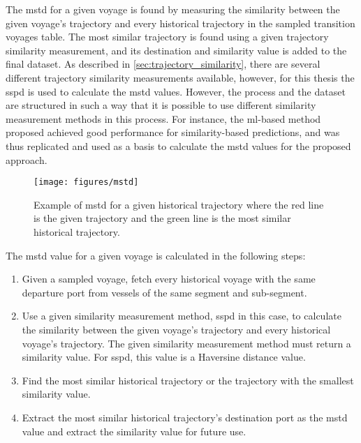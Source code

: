 The \acrshort{mstd} for a given voyage is found by measuring the similarity between the given voyage's trajectory and every historical trajectory in the sampled transition voyages table. The most similar trajectory is found using a given trajectory similarity measurement, and its destination and similarity value is added to the final dataset. As described in \cref{sec:trajectory_similarity}, there are several different trajectory similarity measurements available, however, for this thesis the \acrfull{sspd} is used to calculate the \acrshort{mstd} values. However, the process and the dataset are structured in such a way that it is possible to use different similarity measurement methods in this process. For instance, the \acrshort{ml}-based method proposed \cite{Zhang2020AISApproach} achieved good performance for similarity-based predictions, and was thus replicated and used as a basis to calculate the \acrshort{mstd} values for the proposed approach.

\begin{figure}[htbp]  %
    \centering
    \texttt{[image: figures/mstd]}
    \caption{Example of \acrshort{mstd} for a given historical trajectory where the red line is the given trajectory and the green line is the most similar historical trajectory.}
    \label{fig:mstd}
\end{figure}

The \acrshort{mstd} value for a given voyage is calculated in the following steps:

\begin{enumerate}
    \item Given a sampled voyage, fetch every historical voyage with the same departure port from vessels of the same segment and sub-segment.
    \item Use a given similarity measurement method, \acrshort{sspd} in this case, to calculate the similarity between the given voyage's trajectory and every historical voyage's trajectory. The given similarity measurement method must return a similarity value. For \acrshort{sspd}, this value is a Haversine distance value.
    \item Find the most similar historical trajectory or the trajectory with the smallest similarity value.
    \item Extract the most similar historical trajectory's destination port as the \acrshort{mstd} value and extract the similarity value for future use.
\end{enumerate}

